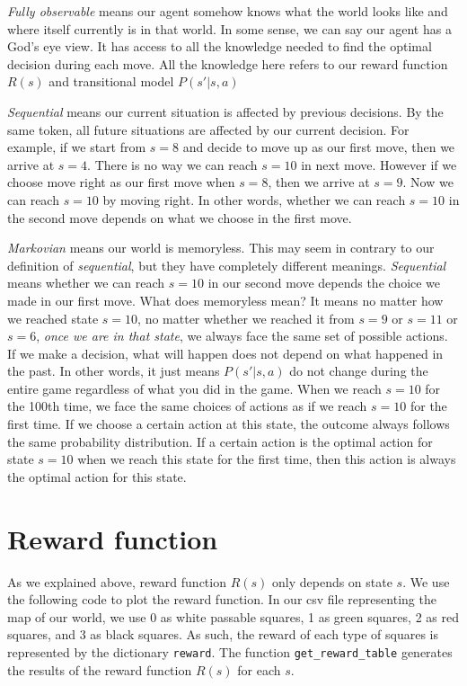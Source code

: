 \documentclass[
	letterpaper
]{article}
\begin{document}
\textit{Fully observable} means our agent somehow knows what the world looks like and where itself currently is in that world. In some sense, we can say our agent has a God's eye view. 
It has access to all the knowledge needed to find the optimal decision during each move.
All the knowledge here refers to our reward function $R(s)$ and transitional model $P(s'| s, a)$

\textit{Sequential} means our current situation is affected by previous decisions. By the same token, all future situations are affected by our current decision.
For example, if we start from $s = 8$ and decide to move up as our first move, then we arrive at $s = 4$. There is no way we can reach $s = 10$ in next move.
However if we choose move right as our first move when $s = 8$, then we arrive at $s = 9$. Now we can reach $s = 10$ by moving right.
In other words, whether we can reach $s = 10$ in the second move depends on what we choose in the first move.

\textit{Markovian} means our world is memoryless.
This may seem in contrary to our definition of \textit{sequential}, but they have completely different meanings.
\textit{Sequential} means whether we can reach $s = 10$ in our second move depends the choice we made in our first move.
What does memoryless mean?
It means no matter how we reached state $s = 10$, no matter whether we reached it from $s  = 9$ or $s = 11$ or $s = 6$, \textit{once we are in that state}, we always face the same set of possible actions.
If we make a decision, what will happen does not depend on what happened in the past.
In other words, it just means $P(s'| s, a)$ do not change during the entire game regardless of what you did in the game.
When we reach $s = 10$ for the 100th time, we face the same choices of actions as if we reach $s = 10$ for the first time.
If we choose a certain action at this state, the outcome always follows the same probability distribution.
If a certain action is the optimal action for state $s = 10$ when we reach this state for the first time, then this action is always the optimal action for this state.


\section{Reward function}
As we explained above, reward function $R(s)$ only depends on state $s$.
We use the following code to plot the reward function.
In our csv file representing the map of our world, we use 0 as white passable squares, 1 as green squares, 2 as red squares, and 3 as black squares.
As such, the reward of each type of squares is represented by the dictionary \verb|reward|.
The function \verb|get_reward_table| generates the results of the reward function $R(s)$ for each $s$.
\end{document}
